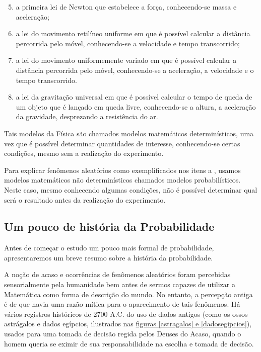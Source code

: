 \begin{enumerate}\setcounter{enumi}{4}
\item {} 
a primeira lei de Newton que estabelece a força, conhecendo-se massa e aceleração;

\item {} 
a lei do movimento retilíneo uniforme em que é possível calcular a distância percorrida pelo móvel, conhecendo-se a velocidade e tempo transcorrido;

\item {} 
a lei do movimento uniformemente variado em que é possível calcular a distância percorrida pelo móvel, conhecendo-se a aceleração, a velocidade e o tempo transcorrido.

\item {} 
a lei da gravitação universal em que é possível calcular o tempo de queda de um objeto que é lançado em queda livre, conhecendo-se a altura, a aceleração da gravidade, desprezando a resistência do ar.

\end{enumerate}

Tais modelos da Física são chamados modelos matemáticos determinísticos, uma vez que é possível determinar quantidades de interesse, conhecendo-se certas condições, mesmo sem a realização do experimento.

Para explicar fenômenos aleatórios como exemplificados nos itens  a , usamos modelos matemáticos não determinísticos chamados modelos probabilísticos. Neste caso, mesmo conhecendo algumas condições, não é possível determinar qual será o resultado antes da realização do experimento.

\subsection{Um pouco de história da Probabilidade}

Antes de começar o estudo um pouco mais formal de probabilidade, apresentaremos um breve resumo sobre a história da probabilidade.

A noção de acaso e ocorrências de fenômenos aleatórios foram percebidas   sensorialmente pela humanidade bem antes de sermos capazes de utilizar a Matemática como forma de descrição do mundo. No entanto, a percepção antiga é de que havia uma razão mítica para o aparecimento de tais fenômenos. Há vários registros históricos de 2700 A.C. do uso de dados antigos (como os ossos astrágalos e dados egípcios, ilustrados nas \hyperref[astragalos]{figuras \ref{astragalos} e \ref{dadosegipcios}}), usados para uma tomada de decisão regida pelos Deuses do Acaso, quando o homem queria se eximir de sua responsabilidade na escolha e tomada de decisão.

